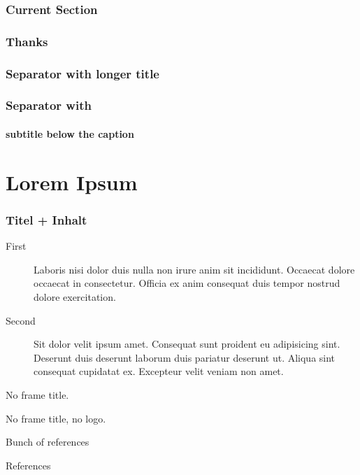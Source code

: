 \documentclass[aspectratio=169,t]{beamer}
\begin{document}
\begin{frame}
  \frametitle{Current Section}

  \tableofcontents[currentsection]
\end{frame}


\begin{frame}[separator]
  \frametitle{Thanks}
\end{frame}


\begin{frame}[separator]
  \frametitle{Separator with longer title}
\end{frame}

\begin{frame}[separator]
\end{frame}


\begin{frame}[separator]
  \frametitle{Separator with}
  \framesubtitle{subtitle below the caption}
\end{frame}


\section{Lorem Ipsum}
\begin{frame}
  \frametitle{Titel + Inhalt}

   \begin{description}
    \item[First] Laboris nisi dolor duis nulla non irure anim sit incididunt.
      Occaecat dolore occaecat in consectetur.
      Officia ex anim consequat duis tempor nostrud dolore exercitation.
    \item[Second] Sit dolor velit ipsum amet.
      Consequat sunt proident eu adipisicing sint.
      Deserunt duis deserunt laborum duis pariatur deserunt ut.
      Aliqua sint consequat cupidatat ex. Excepteur velit veniam non amet.
  \end{description}
\end{frame}

\begin{frame}
  No frame title.
\end{frame}

\begin{frame}[empty]
  No frame title, no logo.
\end{frame}

\begin{frame}{Bunch of references}
  \cite{abrial1996b,ain2019codeclone,allamanis2018survey,alon2019code2vec,%
        blanchette2016learning,blanchette2019machine,bobot2011why3}
\end{frame}


\begin{frame}[allowframebreaks]{References}
  
  
\end{frame}
\end{document}
